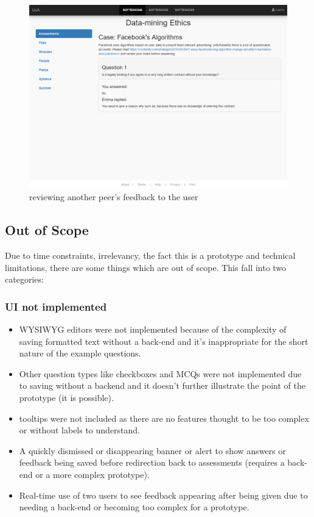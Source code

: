 \documentclass[10pt,a4paper]{article}
\begin{document}
	\begin{figure}[H]
		\centering
		\includegraphics[width=\textwidth]{5 - Data-mining Ethics.PNG}
		\caption{reviewing another peer's feedback to the user}
		\label{fig:five}
	\end{figure}

	\subsection*{Out of Scope}
	Due to time constraints, irrelevancy, the fact this is a prototype and technical limitations, there are some things which are out of scope. This fall into two categories:
		\subsubsection*{UI not implemented}
			\begin{itemize}
				\item WYSIWYG editors were not implemented because of the complexity of saving formatted text without a back-end and it's inappropriate for the short nature of the example questions.
				\item Other question types like checkboxes and MCQs were not implemented due to saving without a backend and it doesn't further illustrate the point of the prototype (it is possible).
				\item tooltips were not included as there are no features thought to be too complex or without labels to understand.		
				\item A quickly dismissed or disappearing banner or alert to show answers or feedback being saved before redirection back to assessments (requires a back-end or a more complex prototype).
				\item Real-time use of two users to see feedback appearing after being given due to needing a back-end or becoming too complex for a prototype.
			\end{itemize}
\end{document}
